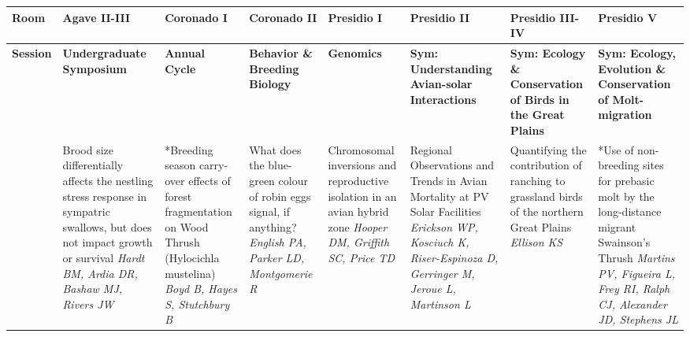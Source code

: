 \begin{tabular}{|x{0.85cm}|a{2.85cm}|x{2.85cm}|x{2.85cm}|x{2.85cm}|a{2.85cm}|a{2.85cm}|a{2.85cm}|}\hline
Room & Agave II-III & Coronado I & Coronado II & Presidio I & Presidio II & Presidio III-IV & Presidio V\\
\hline
\rule{0pt}{1em} \textbf{Session} &\footnotesize \textbf{Undergraduate Symposium} & \footnotesize \textbf{Annual Cycle} & \footnotesize \textbf{Behavior \& Breeding Biology} & \footnotesize \textbf{Genomics} & \footnotesize \textbf{Sym: Understanding Avian-solar Interactions} & \footnotesize \textbf{Sym: Ecology \& Conservation of Birds in the Great Plains} & \footnotesize \textbf{Sym: Ecology, Evolution \& Conservation of Molt-migration}\\
\hline
{}&Brood size differentially affects the nestling stress response in sympatric swallows, but does not impact growth or survival \newline \newline \textit{Hardt BM, Ardia DR, Bashaw MJ, Rivers JW} & *Breeding season carry-over effects of forest fragmentation on Wood Thrush (Hylocichla mustelina) \newline \newline \textit{Boyd B, Hayes S, Stutchbury B} & What does the blue-green colour of robin eggs signal, if anything? \newline \newline \textit{English PA, Parker LD, Montgomerie R} & Chromosomal inversions and reproductive isolation in an avian hybrid zone \newline \newline \textit{Hooper DM, Griffith SC, Price TD} & Regional Observations and Trends in Avian Mortality at PV Solar Facilities \newline \newline \textit{Erickson WP, Kosciuch K, Riser-Espinoza D, Gerringer M, Jeroue L, Martinson L} & Quantifying the contribution of ranching to grassland birds of the northern Great Plains \newline \newline \textit{Ellison KS} & *Use of non-breeding sites for prebasic molt by the long-distance migrant Swainson's Thrush \newline \newline \textit{Martins PV, Figueira L, Frey RI, Ralph CJ, Alexander JD, Stephens JL}\\
\hline

\end{tabular}
